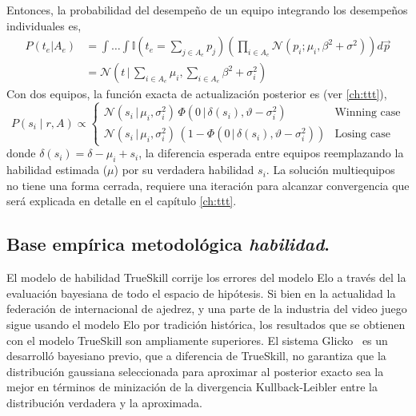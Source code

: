 \documentclass[a4paper,11pt]{book}
\newcommand{\N}{\mathcal{N}}
\theoremstyle{definition}
\begin{document}
Entonces, la probabilidad del desempeño de un equipo integrando los desempeños individuales es,
\begin{align}
 P(t_e|A_e) &= \int \dots \int \mathbb{I}(t_e = \sum_{j\in A_e } p_j ) \left(\prod_{i \in A_e} \N(p_i;\mu_i,\beta^2 + \sigma^2) \right) d\vec{p} \\
 & = \N\left(t\,|\,\sum_{i\in A_e} \mu_i,\sum_{i\in A_e} \beta^2 + \sigma_i^2\right)
\end{align}
%
Con dos equipos, la función exacta de actualización posterior es (ver \ref{ch:ttt}),
%
\begin{equation}
 P(s_i \mid r, A) \propto
 \begin{cases}
  \N(s_i \, | \, \mu_i, \sigma_i^2) \, \Phi(0 \, | \, \delta(s_i), \vartheta - \sigma_i^2) & \text{Winning case} \\
  \N(s_i \, | \, \mu_i, \sigma_i^2 ) \, (1 - \Phi(0 \, | \, \delta(s_i), \vartheta - \sigma_i^2)) & \text{Losing case}
 \end{cases}
\end{equation}
%
donde $\delta(s_i) = \delta - \mu_i + s_i$, la diferencia esperada entre equipos reemplazando la habilidad estimada ($\mu$) por su verdadera habilidad $s_i$.
%
La solución multiequipos no tiene una forma cerrada, requiere una iteración para alcanzar convergencia que será explicada en detalle en el capítulo \ref{ch:ttt}.


\subsection{Base empírica metodológica \emph{habilidad}.}

El modelo de habilidad TrueSkill corrije los errores del modelo Elo a través del la evaluación bayesiana de todo el espacio de hipótesis.
%
Si bien en la actualidad la federación de internacional de ajedrez, y una parte de la industria del video juego sigue usando el modelo Elo por tradición histórica, los resultados que se obtienen con el modelo TrueSkill son ampliamente superiores.
%
El sistema Glicko~\cite{Glikman2013} es un desarrolló bayesiano previo, que a diferencia de TrueSkill, no garantiza que la distribución gaussiana seleccionada para aproximar al posterior exacto sea la mejor en términos de minización de la divergencia Kullback-Leibler entre la distribución verdadera y la aproximada.

\end{document}
